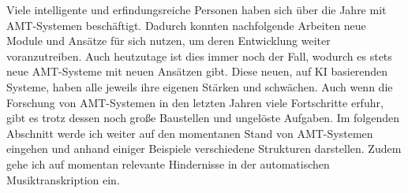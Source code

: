 Viele intelligente und erfindungsreiche Personen haben sich über die Jahre mit AMT-Systemen beschäftigt.
Dadurch konnten nachfolgende Arbeiten neue Module und Ansätze für sich nutzen, um deren Entwicklung weiter voranzutreiben.
Auch heutzutage ist dies immer noch der Fall, wodurch es stets neue AMT-Systeme mit neuen Ansätzen gibt.
Diese neuen, auf KI basierenden Systeme, haben alle jeweils ihre eigenen Stärken und schwächen.
Auch wenn die Forschung von AMT-Systemen in den letzten Jahren viele Fortschritte erfuhr,
gibt es trotz dessen noch große Baustellen und ungelöste Aufgaben.
Im folgenden Abschnitt werde ich weiter auf den momentanen Stand
von AMT-Systemen eingehen und anhand einiger Beispiele verschiedene Strukturen darstellen.
Zudem gehe ich auf momentan relevante Hindernisse in der automatischen Musiktranskription ein.